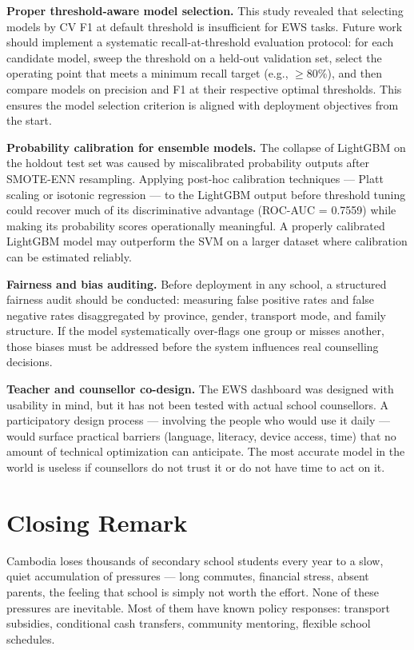 \textbf{Proper threshold-aware model selection.} This study revealed that selecting models by CV F1 at default threshold is insufficient for EWS tasks. Future work should implement a systematic recall-at-threshold evaluation protocol: for each candidate model, sweep the threshold on a held-out validation set, select the operating point that meets a minimum recall target (e.g., $\geq 80\%$), and then compare models on precision and F1 at their respective optimal thresholds. This ensures the model selection criterion is aligned with deployment objectives from the start.

\textbf{Probability calibration for ensemble models.} The collapse of LightGBM on the holdout test set was caused by miscalibrated probability outputs after SMOTE-ENN resampling. Applying post-hoc calibration techniques --- Platt scaling or isotonic regression --- to the LightGBM output before threshold tuning could recover much of its discriminative advantage (ROC-AUC = 0.7559) while making its probability scores operationally meaningful. A properly calibrated LightGBM model may outperform the SVM on a larger dataset where calibration can be estimated reliably.

\textbf{Fairness and bias auditing.} Before deployment in any school, a structured fairness audit should be conducted: measuring false positive rates and false negative rates disaggregated by province, gender, transport mode, and family structure. If the model systematically over-flags one group or misses another, those biases must be addressed before the system influences real counselling decisions.

\textbf{Teacher and counsellor co-design.} The EWS dashboard was designed with usability in mind, but it has not been tested with actual school counsellors. A participatory design process --- involving the people who would use it daily --- would surface practical barriers (language, literacy, device access, time) that no amount of technical optimization can anticipate. The most accurate model in the world is useless if counsellors do not trust it or do not have time to act on it.

\section{Closing Remark}
\label{sec:closing_remark}

Cambodia loses thousands of secondary school students every year to a slow, quiet accumulation of pressures --- long commutes, financial stress, absent parents, the feeling that school is simply not worth the effort. None of these pressures are inevitable. Most of them have known policy responses: transport subsidies, conditional cash transfers, community mentoring, flexible school schedules.

